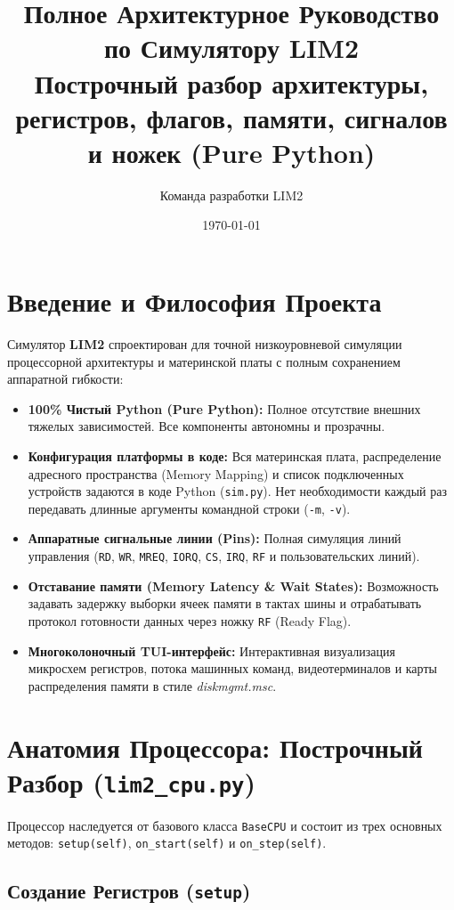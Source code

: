 \documentclass[11pt,a4paper]{article}
\title{\textbf{Полное Архитектурное Руководство по Симулятору LIM2}\\
\large Построчный разбор архитектуры, регистров, флагов, памяти, сигналов и ножек (Pure Python)}
\author{Команда разработки LIM2}
\date{\today}
\begin{document}
\maketitle
\tableofcontents
\newpage

\section{Введение и Философия Проекта}

Симулятор \textbf{LIM2} спроектирован для точной низкоуровневой симуляции процессорной архитектуры и материнской платы с полным сохранением аппаратной гибкости:
\begin{itemize}
    \item \textbf{100\% Чистый Python (Pure Python):} Полное отсутствие внешних тяжелых зависимостей. Все компоненты автономны и прозрачны.
    \item \textbf{Конфигурация платформы в коде:} Вся материнская плата, распределение адресного пространства (Memory Mapping) и список подключенных устройств задаются в коде Python (\texttt{sim.py}). Нет необходимости каждый раз передавать длинные аргументы командной строки (\texttt{-m}, \texttt{-v}).
    \item \textbf{Аппаратные сигнальные линии (Pins):} Полная симуляция линий управления (\texttt{RD}, \texttt{WR}, \texttt{MREQ}, \texttt{IORQ}, \texttt{CS}, \texttt{IRQ}, \texttt{RF} и пользовательских линий).
    \item \textbf{Отставание памяти (Memory Latency \& Wait States):} Возможность задавать задержку выборки ячеек памяти в тактах шины и отрабатывать протокол готовности данных через ножку \texttt{RF} (Ready Flag).
    \item \textbf{Многоколоночный TUI-интерфейс:} Интерактивная визуализация микросхем регистров, потока машинных команд, видеотерминалов и карты распределения памяти в стиле \textit{diskmgmt.msc}.
\end{itemize}

\section{Анатомия Процессора: Построчный Разбор (\texttt{lim2\_cpu.py})}

Процессор наследуется от базового класса \texttt{BaseCPU} и состоит из трех основных методов:
\texttt{setup(self)}, \texttt{on\_start(self)} и \texttt{on\_step(self)}.

\subsection{Создание Регистров (\texttt{setup})}
\end{document}
